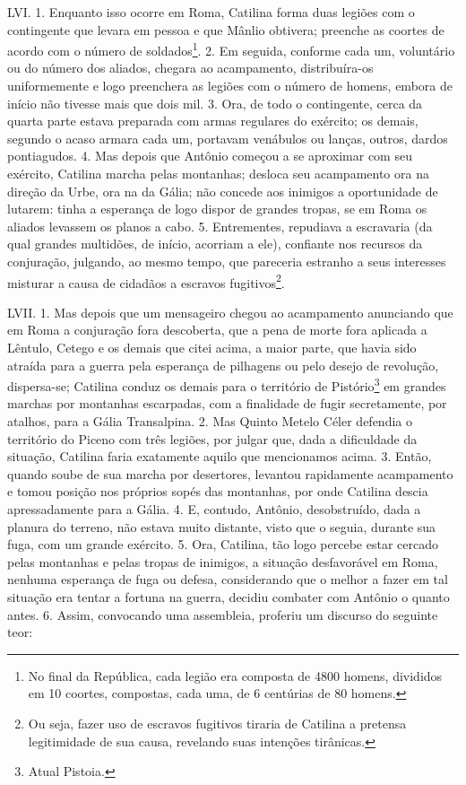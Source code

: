 LVI. 1. Enquanto isso ocorre em Roma, Catilina forma duas legiões com o
contingente que  levara em pessoa e que Mânlio obtivera; preenche as coortes de
acordo com o número de soldados\footnote{No final da República, cada legião era
composta de 4800 homens, divididos em 10 coortes, compostas, cada uma, de 6
centúrias de 80 homens.}. 2. Em seguida, conforme cada um, voluntário ou do
número dos aliados, chegara ao acampamento, distribuíra-os uniformemente e logo
preenchera as legiões com o número de homens, embora de início não tivesse mais
que dois mil. 3. Ora, de todo o contingente, cerca da quarta parte estava
preparada com armas regulares do exército; os demais, segundo o acaso armara
cada um, portavam venábulos ou lanças, outros, dardos pontiagudos. 4. Mas
depois que Antônio começou a se aproximar com seu exército, Catilina marcha
pelas montanhas; desloca seu acampamento ora na direção da Urbe, ora na da
Gália; não concede aos inimigos a oportunidade de lutarem: tinha a esperança de
logo dispor de grandes tropas, se em Roma os aliados levassem os planos a cabo.
5. Entrementes, repudiava a escravaria (da qual grandes multidões, de início,
acorriam a ele), confiante nos recursos da conjuração, julgando, ao mesmo
tempo, que pareceria estranho a seus interesses misturar a causa de cidadãos a
escravos fugitivos\footnote{Ou seja, fazer uso de escravos fugitivos tiraria de
Catilina a pretensa legitimidade de sua causa, revelando suas intenções
tirânicas.}.
 
LVII. 1. Mas depois que um mensageiro chegou ao acampamento anunciando que em
Roma a conjuração fora descoberta, que a pena de morte fora aplicada a Lêntulo,
Cetego e os demais que  citei acima, a maior parte, que havia sido atraída para
a guerra pela esperança de pilhagens ou pelo desejo de revolução, dispersa-se;
Catilina conduz os demais para o território de Pistório\footnote{Atual
Pistoia.} em grandes marchas por montanhas escarpadas, com a finalidade de
fugir secretamente, por atalhos, para a Gália Transalpina. 2. Mas Quinto Metelo
Céler defendia o território do Piceno com três legiões, por julgar que, dada a
dificuldade da situação, Catilina faria exatamente aquilo que mencionamos
acima. 3. Então, quando soube de sua marcha por desertores, levantou
rapidamente acampamento e tomou posição nos próprios sopés das montanhas, por
onde  Catilina descia apressadamente para a Gália. 4. E, contudo, Antônio,
desobstruído, dada a planura do terreno, não estava muito distante, visto que o
seguia, durante sua fuga, com um grande exército. 5. Ora, Catilina, tão logo percebe estar
cercado pelas montanhas e pelas tropas de inimigos, a situação desfavorável em
Roma, nenhuma esperança de fuga ou defesa, considerando que o melhor a fazer em
tal situação era tentar a fortuna na guerra, decidiu combater com Antônio o
quanto antes. 6. Assim, convocando uma assembleia, proferiu um discurso do
seguinte teor:

